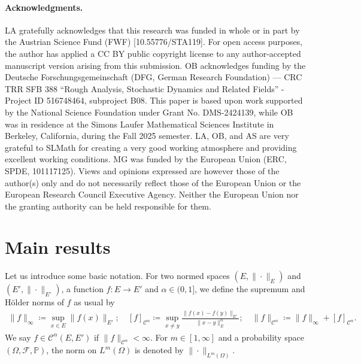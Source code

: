 \documentclass[11pt,a4paper]{article}
\newcommand{\cC}{\mathcal{C}}
\numberwithin{equation}{section}
\theoremstyle{definition}
\theoremstyle{remark}
\theoremstyle{plain}
\begin{document}
\paragraph{Acknowledgments.}
LA gratefully acknowledges that this research was funded in whole or in part by the Austrian Science Fund (FWF) [10.55776/STA119]. For open access purposes, the author has applied a CC BY public copyright license to any author-accepted manuscript version arising from this submission.
OB acknowledges funding by the Deutsche Forschungsgemeinschaft (DFG, German Research Foundation) --- CRC TRR SFB 388 ``Rough Analysis, Stochastic Dynamics and Related Fields'' - Project ID 516748464, subproject B08.  This paper is based upon work supported by the National Science Foundation under Grant No. DMS-2424139, while OB was in
residence at the Simons Laufer Mathematical Sciences Institute in Berkeley, California, during the Fall 2025 semester. LA, OB, and AS are very grateful to SLMath for creating a very good working atmosphere and providing excellent working conditions.
 MG was funded by the European Union (ERC, SPDE, 101117125). Views and opinions expressed
are however those of the author(s) only and do not necessarily reflect those of the European Union
or the European Research Council Executive Agency. Neither the European Union nor the granting
authority can be held responsible for them. 








\section{Main results}

Let us introduce some basic notation.  For two normed spaces $(E,\|\cdot\|_E)$ and $(E',\|\cdot\|_{E'})$, a function $f\colon E \rightarrow E'$ and  $\alpha \in (0,1]$, we define the supremum and H\"older norms of $f$ as usual by 
\begin{align*}
\|f\|_\infty\coloneqq \sup_{x\in E} \|f(x)\|_{E'};\quad 
         [f]_{\cC^\alpha}\coloneqq \sup_{x \neq y} \frac{\|f(x)-f(y)\|_{E'}}{\|x-y\|_E^\alpha};\quad  \|f\|_{\cC^\alpha}\coloneqq \|f\|_\infty+[f]_{\cC^\alpha}.
\end{align*}
We say $f \in \cC^\alpha(E,E')$ if $\|f\|_{\cC^\alpha}<\infty$. For $m \in [1,\infty]$ and a probability space $(\Omega,\mathcal{F},\mathbb{P})$, the norm on $L^m(\Omega)$ is denoted by $\|\cdot\|_{L^m(\Omega)}$.
\end{document}
